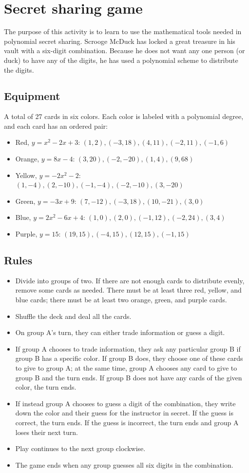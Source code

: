 \documentclass{book}
\theoremstyle{plain}
\theoremstyle{definition}
\begin{document}
\section{Secret sharing game}
The purpose of this activity is to learn to use the mathematical tools needed in polynomial secret sharing. Scrooge McDuck has locked a great treasure in his vault with a six-digit combination. Because he does not want any one person (or duck) to have any of the digits, he has used a polynomial scheme to distribute the digits.

\subsection{Equipment}
A total of 27 cards in six colors. Each color is labeled with a polynomial degree, and each card has an ordered pair:
\begin{itemize}
\item Red, $y=x^2-2x+3$: $(1,2),(-3,18),(4,11),(-2,11),(-1,6)$
\item Orange, $y=8x-4$: $(3,20),(-2,-20),(1,4),(9,68)$
\item Yellow, $y=-2x^2-2$: $(1,-4),(2,-10),(-1,-4),(-2,-10),(3,-20)$
\item Green, $y=-3x+9$: $(7,-12),(-3,18),(10,-21),(3,0)$
\item Blue, $y=2x^2-6x+4$: $(1,0),(2,0),(-1,12),(-2,24),(3,4)$
\item Purple, $y=15$: $(19,15),(-4,15),(12,15),(-1,15)$
\end{itemize}

\subsection{Rules}
\begin{itemize}
\item Divide into groups of two. If there are not enough cards to distribute evenly, remove some cards as needed. There must be at least three red, yellow, and blue cards; there must be at least two orange, green, and purple cards.
\item Shuffle the deck and deal all the cards.
\item On group A's turn, they can either trade information or guess a digit.
\item If group A chooses to trade information, they ask any particular group B if group B has a specific color. If group B does, they choose one of these cards to give to group A; at the same time, group A chooses any card to give to group B and the turn ends. If group B does not have any cards of the given color, the turn ends.
\item If instead group A chooses to guess a digit of the combination, they write down the color and their guess for the instructor in secret. If the guess is correct, the turn ends. If the guess is incorrect, the turn ends and group A loses their next turn.
\item Play continues to the next group clockwise.
\item The game ends when any group guesses all six digits in the combination.
\end{itemize}
\end{document}
